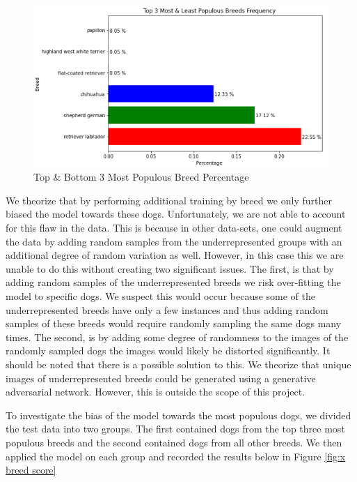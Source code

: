 \documentclass{article}
\begin{document}
\begin{figure}[h]
\centering
	\includegraphics[scale=0.7]{final-report-images/breed_distr.png}
\caption{Top \& Bottom 3 Most Populous Breed Percentage}
\label{fig:x breed distr}
\end{figure}
We theorize that by performing additional training by breed we only further biased the model towards these dogs.  Unfortunately, we are not able to account for this flaw in the data.  This is because in other data-sets, one could augment the data by adding random samples from the underrepresented groups with an additional degree of random variation as well.  However, in this case this we are unable to do this without creating two significant issues.  The first, is that by adding random samples of the underrepresented breeds we risk over-fitting the model to specific dogs.  We suspect this would occur because some of the underrepresented breeds have only a few instances and thus adding random samples of these breeds would require randomly sampling the same dogs many times.  The second, is by adding some degree of randomness to the images of the randomly sampled dogs the images would likely be distorted significantly.  It should be noted that there is a possible solution to this.  We theorize that unique images of underrepresented breeds could be generated using a generative adversarial network.  However, this is outside the scope of this project.

To investigate the bias of the model towards the most populous dogs, we divided the test data into two groups.  The first contained dogs from the top three most populous breeds and the second contained dogs from all other breeds.  We then applied the model on each group and recorded the results below in Figure \ref{fig:x breed score}
\end{document}
